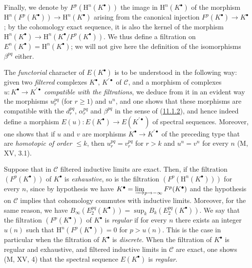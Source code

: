\begin{env}[11.2.2]
Finally, we denote by $F^p(\mathrm H^n(K^\bullet))$ the image in
$\mathrm H^n(K^\bullet)$ of the morphism
$\mathrm H^n(F^p(K^\bullet))\to\mathrm H^n(K^\bullet)$ arising from
the canonical injection $F^p(K^\bullet)\to K^\bullet$; by the cohomology exact
sequence, it is also the kernel of the morphism
$\mathrm H^n(K^\bullet)\to\mathrm H^n(K^\bullet/F^p(K^\bullet))$. We
thus define a filtration on
$E^n(K^\bullet)=\mathrm H^n(K^\bullet)$; we will not give here
the definition of the isomorphisms $\beta^{pq}$ either.
\end{env}

\begin{env}[11.2.3]
\label{0.11.2.3}
The \emph{functorial} character of $E(K^\bullet)$ is to be understood in the
following way: given two \emph{filtered} complexes $K^\bullet$,
$K^{\prime\bullet}$ of $\mathcal C$, and a morphism of complexes
$u:K^\bullet\to K^{\prime\bullet}$ \emph{compatible with the filtrations}, we
deduce from it in an evident way the morphisms $u_r^{pq}$ (for $r\geq1$) and
$u^n$, and one shows that these morphisms are compatible with the $d_r^{pq}$,
$\alpha_r^{pq}$ and $\beta^{pq}$ in the sense of
(\hyperref[0.11.1.2]{11.1.2}), and hence indeed define a morphism
$E(u):E(K^\bullet)\to E(K^{\prime\bullet})$ of spectral sequences. Moreover,
one shows that if $u$ and $v$ are morphisms
$K^\bullet\to K^{\prime\bullet}$ of the preceding type that are \emph{homotopic of order
$\leq k$}, then $u_r^{pq}=v_r^{pq}$ for $r>k$ and $u^n=v^n$ for every $n$
(M, XV, 3.1).
\end{env}

\begin{env}[11.2.4]
\label{0.11.2.4}
Suppose that in $\mathcal C$ filtered inductive limits are
exact. Then, if the filtration $(F^p(K^\bullet))$ of $K^\bullet$ is
\emph{exhaustive}, so is the filtration
$(F^p(\mathrm H^n(K^\bullet)))$ for every $n$, since by hypothesis we have
$K^\bullet=\varinjlim_{p\to-\infty}F^p(K^\bullet)$ and the hypothesis on
$\mathcal C$ implies that cohomology commutes with inductive limits.
Moreover, for the same reason, we have
$B_\infty(E_2^{pq}(K^\bullet))=\sup_k B_k(E_2^{pq}(K^\bullet))$. We say that
the filtration $(F^p(K^\bullet))$ of $K^\bullet$ is \emph{regular} if for
every $n$ there exists an integer $u(n)$ such that
$\mathrm H^n(F^p(K^\bullet))=0$ for $p>u(n)$. This is the case in particular
when the filtration of $K^\bullet$ is \emph{discrete}. When the
filtration of $K^\bullet$ is regular and exhaustive, and filtered inductive
limits in $\mathcal C$ are exact, one shows (M, XV, 4)
that the spectral sequence $E(K^\bullet)$ is \emph{regular}.
\end{env}

